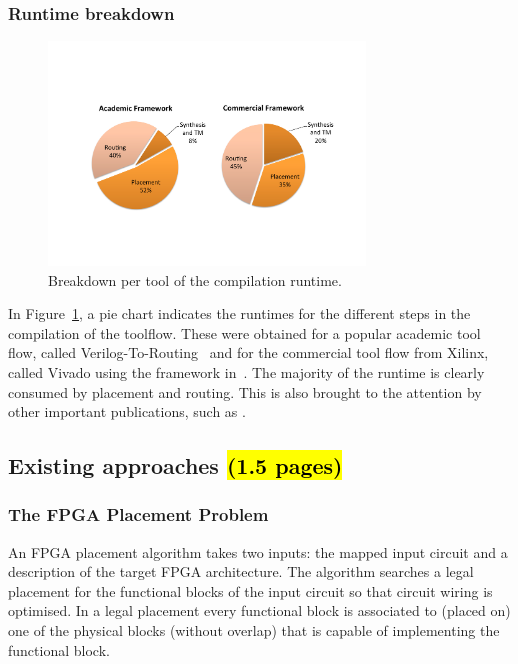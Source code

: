 \documentclass[a4paper,oneside,12pt]{article}
\begin{document}
\subsubsection{Runtime breakdown}
\begin{figure}[t]
\centering
\includegraphics[width = 0.75\textwidth,trim = 0mm 50mm 0mm 40mm, clip]{runtime_breakdown}
\caption{Breakdown per tool of the compilation runtime.}
\label{rt}
\end{figure}

In Figure~\ref{rt}, a pie chart indicates the runtimes for the different steps in the compilation of the toolflow. These were obtained for a popular academic tool flow, called Verilog-To-Routing~\cite{luu2014vtr} and for the commercial tool flow from Xilinx, called Vivado \cite{feist2012vivado} using the framework in~\cite{vansteenkiste2015analyzing}. The majority of the runtime is clearly consumed by placement and routing. This is also brought to the attention by other important publications, such as \cite{murray2015timing}.

\subsection{Existing approaches \hl{(1.5 pages)}}

\subsubsection{The FPGA Placement Problem}
\label{sec:placeprob}
An FPGA placement algorithm takes two inputs: the mapped input circuit and a description of the target FPGA architecture. The algorithm searches a legal placement for the functional blocks of the input circuit so that circuit wiring is optimised. In a legal placement every functional block is associated to (placed on) one of the physical blocks (without overlap) that is capable of implementing the functional block. 
\end{document}

